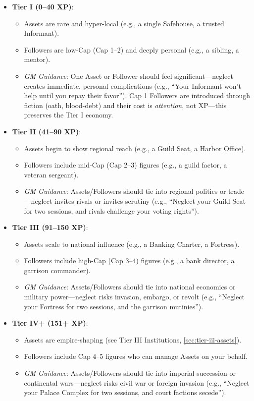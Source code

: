 \begin{itemize}
  \item \textbf{Tier I (0--40 XP)}:  
        \begin{itemize}
          \item Assets are rare and hyper-local (e.g., a single Safehouse, a trusted Informant).  
          \item Followers are low-Cap (Cap 1--2) and deeply personal (e.g., a sibling, a mentor).  
          \item \textit{GM Guidance}: One Asset or Follower should feel significant---neglect creates immediate, personal complications (e.g., ``Your Informant won't help until you repay their favor''). Cap 1 Followers are introduced through fiction (oath, blood-debt) and their cost is \textit{attention}, not XP---this preserves the Tier I economy.  
        \end{itemize}
  \item \textbf{Tier II (41--90 XP)}:  
        \begin{itemize}
          \item Assets begin to show regional reach (e.g., a Guild Seat, a Harbor Office).  
          \item Followers include mid-Cap (Cap 2--3) figures (e.g., a guild factor, a veteran sergeant).  
          \item \textit{GM Guidance}: Assets/Followers should tie into regional politics or trade---neglect invites rivals or invites scrutiny (e.g., ``Neglect your Guild Seat for two sessions, and rivals challenge your voting rights'').  
        \end{itemize}
  \item \textbf{Tier III (91--150 XP)}:  
        \begin{itemize}
          \item Assets scale to national influence (e.g., a Banking Charter, a Fortress).  
          \item Followers include high-Cap (Cap 3--4) figures (e.g., a bank director, a garrison commander).  
          \item \textit{GM Guidance}: Assets/Followers should tie into national economics or military power---neglect risks invasion, embargo, or revolt (e.g., ``Neglect your Fortress for two sessions, and the garrison mutinies'').  
        \end{itemize}
  \item \textbf{Tier IV+ (151+ XP)}:  
        \begin{itemize}
          \item Assets are empire-shaping (see Tier III Institutions, \ref{sec:tier-iii-assets}).  
          \item Followers include Cap 4--5 figures who can manage Assets on your behalf.  
          \item \textit{GM Guidance}: Assets/Followers should tie into imperial succession or continental wars---neglect risks civil war or foreign invasion (e.g., ``Neglect your Palace Complex for two sessions, and court factions secede'').  
        \end{itemize}
\end{itemize}

